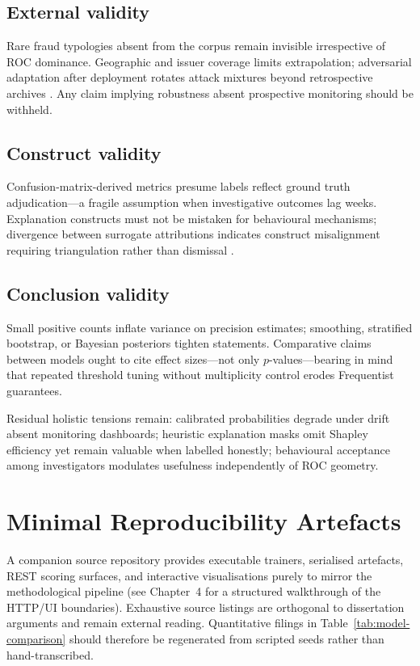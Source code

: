 \subsection{External validity}
Rare fraud typologies absent from the corpus remain invisible irrespective of ROC dominance. Geographic and issuer coverage limits extrapolation; adversarial adaptation after deployment rotates attack mixtures beyond retrospective archives \cite{lucas_jurgovsky_ccfraud_survey2020,yousefi_fraud_survey2019}. Any claim implying robustness absent prospective monitoring should be withheld.

\subsection{Construct validity}
Confusion-matrix-derived metrics presume labels reflect ground truth adjudication—a fragile assumption when investigative outcomes lag weeks. Explanation constructs must not be mistaken for behavioural mechanisms; divergence between surrogate attributions indicates construct misalignment requiring triangulation rather than dismissal \cite{xai_survey}.

\subsection{Conclusion validity}
Small positive counts inflate variance on precision estimates; smoothing, stratified bootstrap, or Bayesian posteriors tighten statements. Comparative claims between models ought to cite effect sizes—not only $p$-values—bearing in mind that repeated threshold tuning without multiplicity control erodes Frequentist guarantees.

Residual holistic tensions remain: calibrated probabilities degrade under drift absent monitoring dashboards; heuristic explanation masks omit Shapley efficiency yet remain valuable when labelled honestly; behavioural acceptance among investigators modulates usefulness independently of ROC geometry.

\section{Minimal Reproducibility Artefacts}
A companion source repository provides executable trainers, serialised artefacts, REST scoring surfaces, and interactive visualisations purely to mirror the methodological pipeline (see Chapter~4 for a structured walkthrough of the HTTP/UI boundaries). Exhaustive source listings are orthogonal to dissertation arguments and remain external reading. Quantitative filings in Table~\ref{tab:model-comparison} should therefore be regenerated from scripted seeds rather than hand-transcribed.

